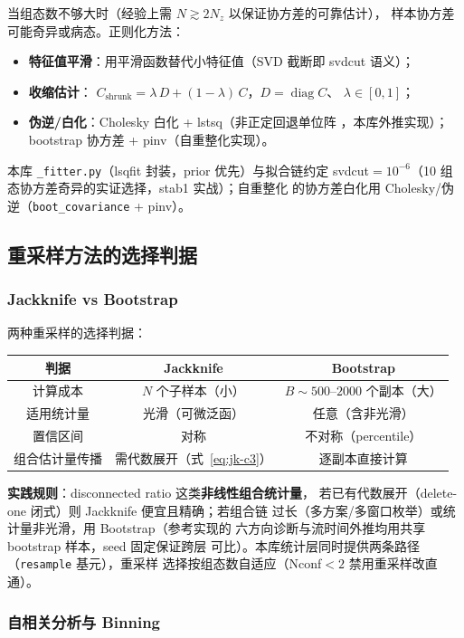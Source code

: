 \documentclass[11pt,a4paper]{ctexart}
\newcommand{\diag}{\operatorname{diag}}
\newcommand{\code}[1]{\texttt{#1}}
\begin{document}
当组态数不够大时（经验上需 $N\gtrsim2N_z$ 以保证协方差的可靠估计），
样本协方差可能奇异或病态。正则化方法：
\begin{itemize}
  \item \textbf{特征值平滑}：用平滑函数替代小特征值（SVD 截断即
  svdcut 语义）；
  \item \textbf{收缩估计}：
  $C_{\text{shrunk}} = \lambda\,D + (1-\lambda)\,C$，$D=\diag C$、
  $\lambda\in[0,1]$；
  \item \textbf{伪逆/白化}：Cholesky 白化 + lstsq（非正定回退单位阵
  ，本库外推实现）；bootstrap 协方差 + pinv（自重整化实现）。
\end{itemize}
本库 \code{\_fitter.py}（lsqfit 封装，prior 优先）与拟合链约定
svdcut$=10^{-6}$（10 组态协方差奇异的实证选择，stab1 实战）；自重整化
的协方差白化用 Cholesky/伪逆（\code{boot\_covariance} + pinv）。

\subsection{重采样方法的选择判据}

\subsubsection{Jackknife vs Bootstrap}

两种重采样的选择判据：
\begin{center}
\small
\begin{tabular}{c c c}
\toprule
\textbf{判据} & \textbf{Jackknife} & \textbf{Bootstrap} \\
\midrule
计算成本 & $N$ 个子样本（小） & $B\sim500$--$2000$ 个副本（大） \\
适用统计量 & 光滑（可微泛函） & 任意（含非光滑） \\
置信区间 & 对称 & 不对称（percentile） \\
组合估计量传播 & 需代数展开（式~\eqref{eq:jk-c3}） & 逐副本直接计算 \\
\bottomrule
\end{tabular}
\end{center}
\textbf{实践规则}：disconnected ratio 这类\textbf{非线性组合统计量}，
若已有代数展开（delete-one 闭式）则 Jackknife 便宜且精确；若组合链
过长（多方案/多窗口枚举）或统计量非光滑，用 Bootstrap（参考实现的
六方向诊断与流时间外推均用共享 bootstrap 样本，seed 固定保证跨层
可比）。本库统计层同时提供两条路径（\code{resample} 基元），重采样
选择按组态数自适应（Nconf$<2$ 禁用重采样改直通）。

\subsubsection{自相关分析与 Binning}
\end{document}
